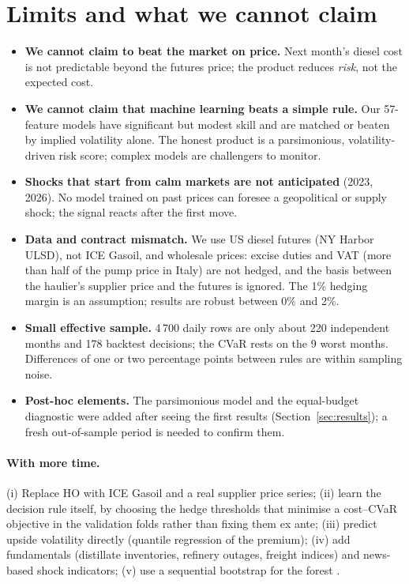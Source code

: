 \section{Limits and what we cannot claim}\label{sec:limits}

\begin{itemize}
\item \textbf{We cannot claim to beat the market on price.} Next month's diesel cost is not predictable
beyond the futures price; the product reduces \emph{risk}, not the expected cost.
\item \textbf{We cannot claim that machine learning beats a simple rule.} Our 57-feature models have
significant but modest skill and are matched or beaten by implied volatility alone. The honest product is a
parsimonious, volatility-driven risk score; complex models are challengers to monitor.
\item \textbf{Shocks that start from calm markets are not anticipated} (2023, 2026). No model trained on
past prices can foresee a geopolitical or supply shock; the signal reacts after the first move.
\item \textbf{Data and contract mismatch.} We use US diesel futures (NY Harbor ULSD), not ICE Gasoil, and
wholesale prices: excise duties and VAT (more than half of the pump price in Italy) are not hedged, and the
basis between the haulier's supplier price and the futures is ignored. The 1\% hedging margin is an
assumption; results are robust between 0\% and 2\%.
\item \textbf{Small effective sample.} 4\,700 daily rows are only about 220 independent months and 178
backtest decisions; the CVaR rests on the 9 worst months. Differences of one or two percentage points
between rules are within sampling noise.
\item \textbf{Post-hoc elements.} The parsimonious model and the equal-budget diagnostic were added after
seeing the first results (Section~\ref{sec:results}); a fresh out-of-sample period is needed to confirm
them.
\end{itemize}

\paragraph{With more time.} (i) Replace HO with ICE Gasoil and a real supplier price series; (ii) learn the
decision rule itself, by choosing the hedge thresholds that minimise a cost--CVaR objective in the
validation folds rather than fixing them ex ante; (iii) predict upside volatility directly (quantile
regression of the premium); (iv) add fundamentals (distillate inventories, refinery outages, freight
indices) and news-based shock indicators; (v) use a sequential bootstrap for the forest
\citep{lopezdeprado2018}.

